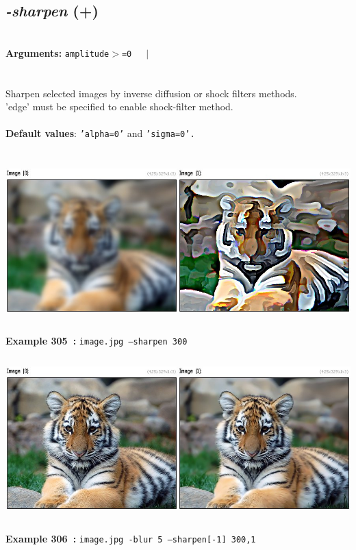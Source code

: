 \documentclass[a4paper,11pt,twoside]{book}
\begin{document}
\subsection{\emph{-sharpen} (+)}\vspace*{-0.5em}
~\\\textbf{Arguments: } 
{\small \texttt{amplitude$>$=0}}~~~$|$\\
\\~\\
Sharpen selected images by inverse diffusion or shock filters methods.
~\\'edge' must be specified to enable shock-filter method.
~\\~\\\textbf{Default values}: {\small \texttt{'alpha=0'} and \texttt{'sigma=0'.}}
\begin{center}\includegraphics[keepaspectratio=true,height=7cm,width=\textwidth]{img/gmic_def305.jpg}\\
{\footnotesize \textbf{Example 305~:} \texttt{image.jpg --sharpen 300}}
\\\includegraphics[keepaspectratio=true,height=7cm,width=\textwidth]{img/gmic_def306.jpg}\\
{\footnotesize \textbf{Example 306~:} \texttt{image.jpg -blur 5 --sharpen[-1] 300,1}}
\end{center}
\end{document}
